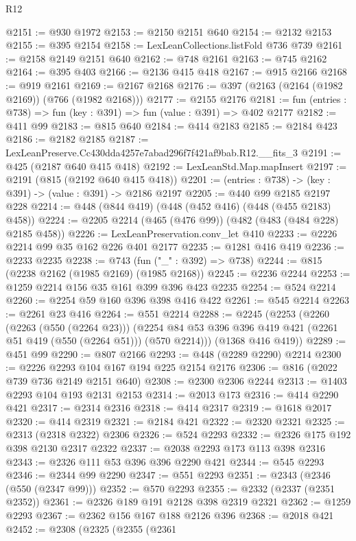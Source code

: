 \begin{lexlean}{R12}
\begin{coremodule}
@2151 := @930 @1972
@2153 := @2150 @2151 @640
@2154 := @2132 @2153
@2155 := @395 @2154
@2158 := LexLeanCollections.listFold @736 @739
@2161 := @2158 @2149 @2151 @640
@2162 := @748 @2161
@2163 := @745 @2162
@2164 := @395 @403
@2166 := @2136 @415 @418
@2167 := @915 @2166
@2168 := @919 @2161
@2169 := @2167 @2168
@2176 := @397 (@2163 (@2164 (@1982 @2169)) (@766 (@1982 @2168)))
@2177 := @2155 @2176
@2181 := fun (entries : @738) => fun (key : @391) => fun (value : @391) => @402 @2177
@2182 := @411 @99
@2183 := @815 @640
@2184 := @414 @2183
@2185 := @2184 @423
@2186 := @2182 @2185
@2187 := LexLeanPreserve.Cc430dda4257e7abad296f7f421af9bab.R12.__fits_3
@2191 := @425 (@2187 @640 @415 @418)
@2192 := LexLeanStd.Map.mapInsert
@2197 := @2191 (@815 (@2192 @640 @415 @418))
@2201 := (entries : @738) -> (key : @391) -> (value : @391) -> @2186 @2197
@2205 := @440 @99 @2185 @2197 @228
@2214 := @448 (@844 @419) (@448 (@452 @416) (@448 (@455 @2183) @458))
@2224 := @2205 @2214 (@465 (@476 @99)) (@482 (@483 (@484 @228) @2185 @458))
@2226 := LexLeanPreservation.conv_let @410
@2233 := @2226 @2214 @99 @35 @162 @226 @401 @2177
@2235 := @1281 @416 @419
@2236 := @2233 @2235
@2238 := @743 (fun ("_" : @392) => @738)
@2244 := @815 (@2238 @2162 (@1985 @2169) (@1985 @2168))
@2245 := @2236 @2244
@2253 := @1259 @2214 @156 @35 @161 @399 @396 @423 @2235
@2254 := @524 @2214
@2260 := @2254 @59 @160 @396 @398 @416 @422
@2261 := @545 @2214
@2263 := @2261 @23 @416
@2264 := @551 @2214
@2288 := @2245
    (@2253
      (@2260
        (@2263 (@550 (@2264 @23)))
        (@2254 @84 @53 @396 @396 @419 @421 (@2261 @51 @419 (@550 (@2264 @51))) (@570 @2214)))
      (@1368 @416 @419))
@2289 := @451 @99
@2290 := @807 @2166
@2293 := @448 (@2289 @2290) @2214
@2300 := @2226 @2293 @104 @167 @194 @225 @2154 @2176
@2306 := @816 (@2022 @739 @736 @2149 @2151 @640)
@2308 := @2300 @2306 @2244
@2313 := @1403 @2293 @104 @193 @2131 @2153
@2314 := @2013 @173
@2316 := @414 @2290 @421
@2317 := @2314 @2316
@2318 := @414 @2317
@2319 := @1618 @2017
@2320 := @414 @2319
@2321 := @2184 @421
@2322 := @2320 @2321
@2325 := @2313 (@2318 @2322) @2306
@2326 := @524 @2293
@2332 := @2326 @175 @192 @398 @2130 @2317 @2322
@2337 := @2038 @2293 @173 @113 @398 @2316
@2343 := @2326 @111 @53 @396 @396 @2290 @421
@2344 := @545 @2293
@2346 := @2344 @99 @2290
@2347 := @551 @2293
@2351 := @2343 (@2346 (@550 (@2347 @99)))
@2352 := @570 @2293
@2355 := @2332 (@2337 (@2351 @2352))
@2361 := @2326 @189 @191 @2128 @398 @2319 @2321
@2362 := @1259 @2293
@2367 := @2362 @156 @167 @188 @2126 @396
@2368 := @2018 @421
@2452 := @2308
    (@2325
      (@2355
        (@2361

\end{coremodule}
\end{lexlean}
